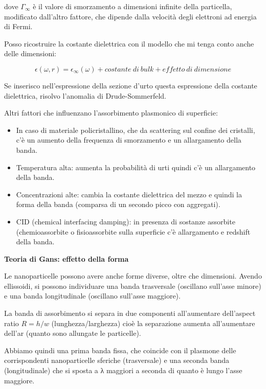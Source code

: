 dove \(\Gamma_{\infty}\) è il valore di smorzamento a dimensioni
infinite della particella, modificato dall'altro fattore, che dipende
dalla velocità degli elettroni ad energia di Fermi.

Posso ricostruire la costante dielettrica con il modello che mi tenga
conto anche delle dimensioni:

\[\epsilon\left( \omega,r \right) = \epsilon_{\infty}\left( \omega \right) + costante\ di\ bulk + effetto\ di\ dimensione\]

Se inserisco nell'espressione della sezione d'urto questa espressione
della costante dielettrica, risolvo l'anomalia di Drude-Sommerfeld.

Altri fattori che influenzano l'assorbimento plasmonico di superficie:

\begin{itemize}
\item
  In caso di materiale policristallino, che da scattering sul confine
  dei cristalli, c'è un aumento della frequenza di smorzamento e un
  allargamento della banda.
\item
  Temperatura alta: aumenta la probabilità di urti quindi c'è un
  allargamento della banda.
\item
  Concentrazioni alte: cambia la costante dielettrica del mezzo e quindi
  la forma della banda (comparsa di un secondo picco con aggregati).
\item
  CID (chemical interfacing damping): in presenza di sostanze assorbite
  (chemioassorbite o fisioassorbite sulla superficie c'è allargamento e
  redshift della banda.
\end{itemize}

\textbf{Teoria di Gans: effetto della forma}

Le nanoparticelle possono avere anche forme diverse, oltre che
dimensioni. Avendo ellissoidi, si possono individuare una banda
trasversale (oscillano sull'asse minore) e una banda longitudinale
(oscillano sull'asse maggiore).

La banda di assorbimento si separa in due componenti all'aumentare
dell'aspect ratio \(R = h/w\) (lunghezza/larghezza) cioè la separazione
aumenta all'aumentare dell'ar (quanto sono allungate le particelle).

Abbiamo quindi una prima banda fissa, che coincide con il plasmone delle
corrispondenti nanoparticelle sferiche (trasversale) e una seconda banda
(longitudinale) che si sposta a λ maggiori a seconda di quanto è lungo
l'asse maggiore.

